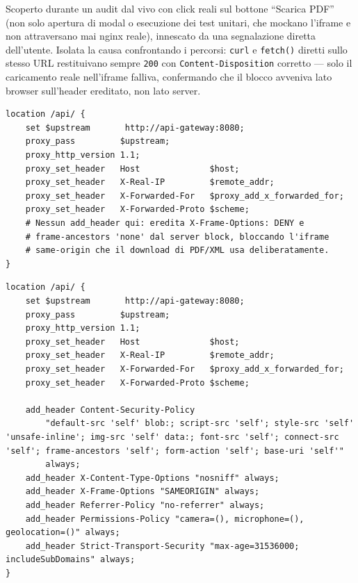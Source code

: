 ﻿\documentclass[a4paper,12pt]{report}
\begin{document}
Scoperto durante un audit dal vivo con click reali sul bottone ``Scarica PDF''
(non solo apertura di modal o esecuzione dei test unitari, che mockano l'iframe e
non attraversano mai nginx reale), innescato da una segnalazione diretta
dell'utente. Isolata la causa confrontando i percorsi: \texttt{curl} e
\texttt{fetch()} diretti sullo stesso URL restituivano sempre \texttt{200} con
\texttt{Content-Disposition} corretto --- solo il caricamento reale nell'iframe
falliva, confermando che il blocco avveniva lato browser sull'header ereditato, non
lato server.

\begin{insecurebox}[title={frontend/nginx.conf --- \texttt{/api/} eredita gli header del server block (baseline)}]
\begin{lstlisting}[style=bash]
location /api/ {
    set $upstream       http://api-gateway:8080;
    proxy_pass         $upstream;
    proxy_http_version 1.1;
    proxy_set_header   Host              $host;
    proxy_set_header   X-Real-IP         $remote_addr;
    proxy_set_header   X-Forwarded-For   $proxy_add_x_forwarded_for;
    proxy_set_header   X-Forwarded-Proto $scheme;
    # Nessun add_header qui: eredita X-Frame-Options: DENY e
    # frame-ancestors 'none' dal server block, bloccando l'iframe
    # same-origin che il download di PDF/XML usa deliberatamente.
}
\end{lstlisting}
\end{insecurebox}

\begin{securebox}[title={frontend/nginx.conf --- \texttt{/api/} dichiara i propri header (main)}]
\begin{lstlisting}[style=bash]
location /api/ {
    set $upstream       http://api-gateway:8080;
    proxy_pass         $upstream;
    proxy_http_version 1.1;
    proxy_set_header   Host              $host;
    proxy_set_header   X-Real-IP         $remote_addr;
    proxy_set_header   X-Forwarded-For   $proxy_add_x_forwarded_for;
    proxy_set_header   X-Forwarded-Proto $scheme;

    add_header Content-Security-Policy
        "default-src 'self' blob:; script-src 'self'; style-src 'self' 'unsafe-inline'; img-src 'self' data:; font-src 'self'; connect-src 'self'; frame-ancestors 'self'; form-action 'self'; base-uri 'self'"
        always;
    add_header X-Content-Type-Options "nosniff" always;
    add_header X-Frame-Options "SAMEORIGIN" always;
    add_header Referrer-Policy "no-referrer" always;
    add_header Permissions-Policy "camera=(), microphone=(), geolocation=()" always;
    add_header Strict-Transport-Security "max-age=31536000; includeSubDomains" always;
}
\end{lstlisting}
\end{securebox}
\end{document}
